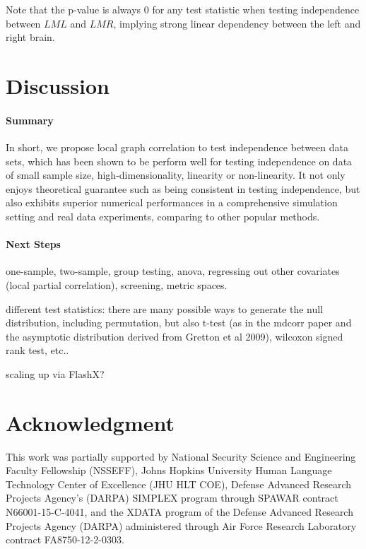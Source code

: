 \documentclass[11pt]{article}
\begin{document}
Note that the p-value is always $0$ for any test statistic when testing independence between $LML$ and $LMR$, implying strong linear dependency between the left and right brain.

\section{Discussion}
\label{conclu}

\paragraph{Summary}

In short, we propose local graph correlation to test independence between data sets, which has been shown to be perform well for testing independence on data of small sample size, high-dimensionality, linearity or non-linearity. It not only enjoys theoretical guarantee such as being consistent in testing independence, but also exhibits superior numerical performances in a comprehensive simulation setting and real data experiments, comparing to other popular methods.


\paragraph{Next Steps}

one-sample, two-sample, group testing, anova, regressing out other covariates (local partial correlation), screening, metric spaces.

different test statistics: there are many possible ways to generate the null distribution, including permutation, but also t-test (as in the mdcorr paper and the asymptotic distribution derived from Gretton et al 2009), wilcoxon signed rank test, etc..


scaling up via FlashX?

\section*{Acknowledgment}
This work was partially supported by 
% 
National Security Science and Engineering Faculty Fellowship (NSSEFF), 
% 
Johns Hopkins University Human Language Technology Center of Excellence (JHU HLT COE), 
% 
Defense Advanced Research Projects Agency's (DARPA) SIMPLEX program through SPAWAR contract N66001-15-C-4041, 
% 
and the XDATA program of the Defense Advanced Research Projects Agency (DARPA) administered through Air Force Research Laboratory contract FA8750-12-2-0303.
\end{document}
